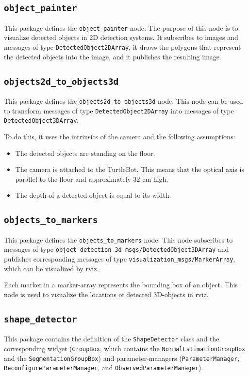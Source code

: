 \documentclass{article}
\newcommand{\code}[1]{\texttt{#1}}
\begin{document}
\subsection{\code{object\_painter}}

This package defines the \code{object\_painter} node.
The purpose of this node is to visualize detected objects in 2D detection systems.
It subscribes to images and messages of type \code{DetectedObject2DArray},
it draws the polygons that represent the detected objects into the image, and it
publishes the resulting image.

\subsection{\code{objects2d\_to\_objects3d}}
This package defines the \code{objects2d\_to\_objects3d} node.
This node can be used to transform messages of type \code{DetectedObject2DArray}
into messages of type \code{DetectedObject3DArray}.

To do this, it uses the intrinsics of the camera and the following assumptions:
\begin{itemize}
	\item The detected objects are standing on the floor.
	\item The camera is attached to the TurtleBot.
		This means that the optical axis is parallel to the floor and
		approximately 32 cm high.
	\item The depth of a detected object is equal to its width.
\end{itemize}


\subsection{\code{objects\_to\_markers}}

This package defines the \code{objects\_to\_markers} node.
This node subscribes to messages of type
\code{object\_detection\_3d\_msgs/DetectedObject3DArray} and
publishes corresponding messages of type
\code{visualization\_msgs/MarkerArray}, which can be visualized by rviz.

Each marker in a marker-array represents the bounding box of an object.
This node is used to visualize the locations of detected 3D-objects in rviz.


\subsection{\code{shape\_detector}}
This package contains the definition of the \code{ShapeDetector} class
and the corresponding widget (\code{GroupBox}, which contains the
\code{NormalEstimationGroupBox} and the \code{SegmentationGroupBox})
and parameter-managers
(\code{ParameterManager}, \code{ReconfigureParameterManager}, and
\code{ObservedParameterManager}).
\end{document}

